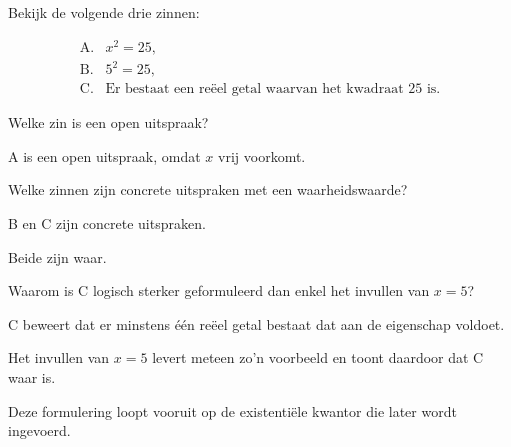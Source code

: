 \documentclass{ximera}
\begin{document}
\begin{oefening}{\oefU \ESS}

Bekijk de volgende drie zinnen:

\[
\begin{array}{ll}
\text{A.}&x^2=25,\\[1mm]
\text{B.}&5^2=25,\\[1mm]
\text{C.}&\text{Er bestaat een reëel getal waarvan het kwadraat }25\text{ is.}
\end{array}
\]

\begin{question}
Welke zin is een open uitspraak?

\begin{oplossing}
A is een open uitspraak, omdat $x$ vrij voorkomt.
\end{oplossing}
\end{question}


\begin{question}
Welke zinnen zijn concrete uitspraken met een waarheidswaarde?

\begin{oplossing}
B en C zijn concrete uitspraken.

Beide zijn waar.
\end{oplossing}
\end{question}


\begin{question}
Waarom is C logisch sterker geformuleerd dan enkel het invullen van
$x=5$?

\begin{oplossing}
C beweert dat er minstens één reëel getal bestaat dat aan de eigenschap
voldoet.

Het invullen van $x=5$ levert meteen zo'n voorbeeld en toont daardoor
dat C waar is.

Deze formulering loopt vooruit op de existentiële kwantor die later
wordt ingevoerd.
\end{oplossing}
\end{question}

\end{oefening}
\end{document}
